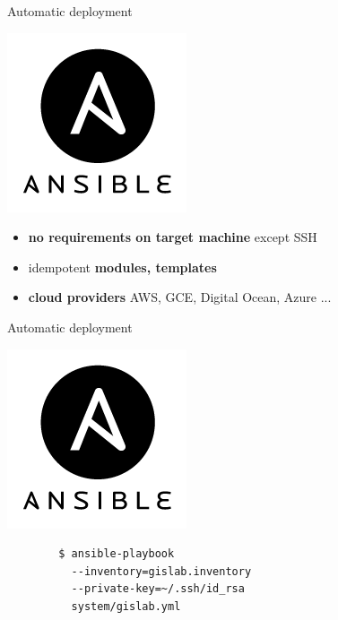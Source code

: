 \documentclass[12pt]{beamer}
\begin{document}
\begin{frame}{Automatic deployment}
	\begin{center}
		\includegraphics[keepaspectratio=true,height=0.4\textheight]{images/ansible.png}
	\end{center}
	\begin{itemize}
		\item \textbf{no requirements on target machine} except SSH
		\item idempotent \textbf{modules, templates}
		\item \textbf{cloud providers} AWS, GCE, Digital Ocean, Azure ...
	\end{itemize}
\end{frame}

\begin{frame}[fragile]{Automatic deployment}
	\begin{center}
		\includegraphics[keepaspectratio=true,height=0.4\textheight]{images/ansible.png}
	\end{center}

   \lstset{language=sh}
	\begin{lstlisting}
		$ ansible-playbook
		  --inventory=gislab.inventory
		  --private-key=~/.ssh/id_rsa
		  system/gislab.yml
	\end{lstlisting}
\end{frame}
\end{document}
